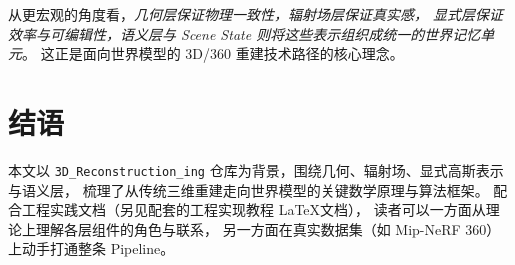 \documentclass[12pt]{ctexart}
\begin{document}
从更宏观的角度看，\emph{几何层保证物理一致性，辐射场层保证真实感，
显式层保证效率与可编辑性，语义层与 Scene State 则将这些表示组织成统一的世界记忆单元}。
这正是面向世界模型的 3D/360 重建技术路径的核心理念。

\section{结语}

本文以 \texttt{3D\_Reconstruction\_ing} 仓库为背景，围绕几何、辐射场、显式高斯表示与语义层，
梳理了从传统三维重建走向世界模型的关键数学原理与算法框架。
配合工程实践文档（另见配套的工程实现教程 \LaTeX 文档），
读者可以一方面从理论上理解各层组件的角色与联系，
另一方面在真实数据集（如 Mip-NeRF 360）上动手打通整条 Pipeline。
\end{document}

